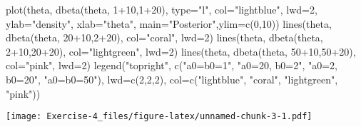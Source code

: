 \documentclass[
]{article}
\newenvironment{Shaded}{\begin{snugshade}}{\end{snugshade}}
\newcommand{\AttributeTok}[1]{\textcolor[rgb]{0.77,0.63,0.00}{#1}}
\newcommand{\DecValTok}[1]{\textcolor[rgb]{0.00,0.00,0.81}{#1}}
\newcommand{\FunctionTok}[1]{\textcolor[rgb]{0.00,0.00,0.00}{#1}}
\newcommand{\NormalTok}[1]{#1}
\newcommand{\SpecialCharTok}[1]{\textcolor[rgb]{0.00,0.00,0.00}{#1}}
\newcommand{\StringTok}[1]{\textcolor[rgb]{0.31,0.60,0.02}{#1}}
\begin{document}
\begin{Shaded}
\begin{Highlighting}[]
\FunctionTok{plot}\NormalTok{(theta, }\FunctionTok{dbeta}\NormalTok{(theta, }\DecValTok{1}\SpecialCharTok{+}\DecValTok{10}\NormalTok{,}\DecValTok{1}\SpecialCharTok{+}\DecValTok{20}\NormalTok{), }\AttributeTok{type=}\StringTok{"l"}\NormalTok{, }\AttributeTok{col=}\StringTok{"lightblue"}\NormalTok{, }\AttributeTok{lwd=}\DecValTok{2}\NormalTok{,}
\AttributeTok{ylab=}\StringTok{"density"}\NormalTok{, }\AttributeTok{xlab=}\StringTok{"theta"}\NormalTok{, }\AttributeTok{main=}\StringTok{"Posterior"}\NormalTok{,}\AttributeTok{ylim=}\FunctionTok{c}\NormalTok{(}\DecValTok{0}\NormalTok{,}\DecValTok{10}\NormalTok{))}
\FunctionTok{lines}\NormalTok{(theta, }\FunctionTok{dbeta}\NormalTok{(theta, }\DecValTok{20}\SpecialCharTok{+}\DecValTok{10}\NormalTok{,}\DecValTok{2}\SpecialCharTok{+}\DecValTok{20}\NormalTok{), }\AttributeTok{col=}\StringTok{"coral"}\NormalTok{, }\AttributeTok{lwd=}\DecValTok{2}\NormalTok{)}
\FunctionTok{lines}\NormalTok{(theta, }\FunctionTok{dbeta}\NormalTok{(theta, }\DecValTok{2}\SpecialCharTok{+}\DecValTok{10}\NormalTok{,}\DecValTok{20}\SpecialCharTok{+}\DecValTok{20}\NormalTok{), }\AttributeTok{col=}\StringTok{"lightgreen"}\NormalTok{, }\AttributeTok{lwd=}\DecValTok{2}\NormalTok{)}
\FunctionTok{lines}\NormalTok{(theta, }\FunctionTok{dbeta}\NormalTok{(theta, }\DecValTok{50}\SpecialCharTok{+}\DecValTok{10}\NormalTok{,}\DecValTok{50}\SpecialCharTok{+}\DecValTok{20}\NormalTok{), }\AttributeTok{col=}\StringTok{"pink"}\NormalTok{, }\AttributeTok{lwd=}\DecValTok{2}\NormalTok{)}
\FunctionTok{legend}\NormalTok{(}\StringTok{"topright"}\NormalTok{, }\FunctionTok{c}\NormalTok{(}\StringTok{"a0=b0=1"}\NormalTok{, }\StringTok{"a0=20, b0=2"}\NormalTok{, }\StringTok{"a0=2, b0=20"}\NormalTok{, }\StringTok{"a0=b0=50"}\NormalTok{),}
\AttributeTok{lwd=}\FunctionTok{c}\NormalTok{(}\DecValTok{2}\NormalTok{,}\DecValTok{2}\NormalTok{,}\DecValTok{2}\NormalTok{), }\AttributeTok{col=}\FunctionTok{c}\NormalTok{(}\StringTok{"lightblue"}\NormalTok{, }\StringTok{"coral"}\NormalTok{, }\StringTok{"lightgreen"}\NormalTok{, }\StringTok{"pink"}\NormalTok{))}
\end{Highlighting}
\end{Shaded}

\texttt{[image: Exercise-4\_files/figure-latex/unnamed-chunk-3-1.pdf]}
\end{document}
